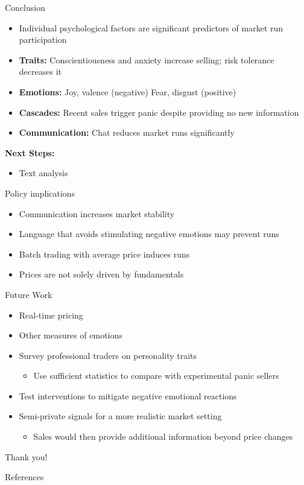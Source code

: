\documentclass{beamer}
\begin{document}
\begin{frame}{Conclusion}
\begin{itemize}
    \item Individual psychological factors are significant predictors of market run participation
    \item \textbf{Traits:} Conscientiousness and anxiety increase selling; risk tolerance decreases it
    \item \textbf{Emotions:} Joy, valence (negative) Fear, disgust (positive)    \item \textbf{Cascades:} Recent sales trigger panic despite providing no new information
    \item \textbf{Communication:} Chat reduces market runs significantly
\end{itemize}

\vspace{0.3cm}
\textbf{Next Steps:}
\begin{itemize}
    \item Text analysis
\end{itemize}
\end{frame}


\begin{frame}{Policy implications}
\begin{itemize}
    \item Communication increases market stability
    \item Language that avoids stimulating negative emotions may prevent runs
    \item Batch trading with average price induces runs
    \item Prices are not solely driven by fundamentals
\end{itemize}
\end{frame}


\begin{frame}{Future Work}
\begin{itemize}
    \item Real-time pricing
    \item Other measures of emotions
    \item Survey professional traders on personality traits
    \begin{itemize}
        \item Use sufficient statistics to compare with experimental panic sellers
    \end{itemize}
    \item Test interventions to mitigate negative emotional reactions
    \item Semi-private signals for a more realistic market setting
    \begin{itemize}
        \item Sales would then provide additional information beyond price changes
    \end{itemize}
\end{itemize}

\vspace{1cm}
\centering
\Large Thank you!
\end{frame}


\begin{frame}[allowframebreaks]{References}

\scriptsize

\end{frame}
\end{document}

